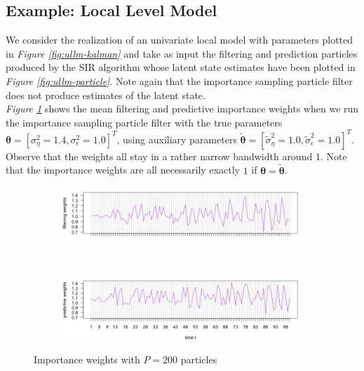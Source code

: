 \documentclass[11pt, oneside]{scrreprt}   	%
\begin{document}
\subsection{Example: Local Level Model}
We consider the realization of an univariate local model with parameters plotted in \textit{Figure \ref{fig:ullm-kalman}} and take as input the filtering and prediction particles produced by the SIR algorithm whose latent state estimates have been plotted in \textit{Figure \ref{fig:ullm-particle}}. Note again that the importance sampling particle filter does not produce estimates of the latent state.\\

\textit{Figure \ref{fig:ullm_is-particle}} shows the mean filtering and predictive importance weights when we run the importance sampling particle filter with the true parameters $\boldsymbol{\theta} = [\sigma_{\eta}^2=1.4, \sigma_{\epsilon}^2=1.0]^T$, using auxiliary parameters $\boldsymbol{\tilde{\theta}} = [\tilde{\sigma}_{\eta}^2=1.0, \tilde{\sigma}_{\epsilon}^2=1.0]^T$. Observe that the weights all stay in a rather narrow bandwidth around 1. Note that the importance weights are all necessarily exactly $1$ if $\boldsymbol{\theta}=\boldsymbol{\tilde{\theta}}$.

\begin{figure}[h!]
\centering
\begin{subfigure}{1\textwidth}
  \centering
  \includegraphics[width=150mm]{../../images/ullm_is_filt_weights_P200.png}
\end{subfigure}%
\\
\begin{subfigure}{1\textwidth}
  \centering
  \includegraphics[width=150mm]{../../images/ullm_is_pred_weights_P200.png}
\end{subfigure}
\caption{Importance weights with $P=200$ particles}
\label{fig:ullm_is-particle}
\end{figure}
\end{document}
